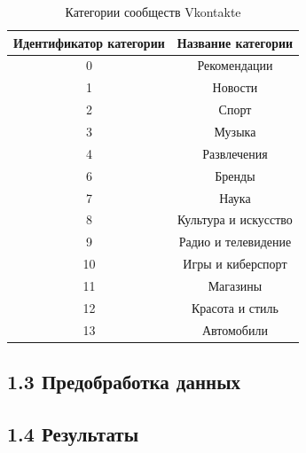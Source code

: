 \documentclass[a4paper]{report}
\begin{document}
	\begin{table}[]
\centering


\begin{tabular}{|c|c|}
\hline

\textbf{Идентификатор категории} & \textbf{Название категории} \\ \hline \hline
0                                & Рекомендации                \\ \hline
1                                & Новости                     \\ \hline
2                                & Спорт                       \\ \hline
3                                & Музыка                      \\ \hline
4                                & Развлечения                 \\ \hline
6                                & Бренды                      \\ \hline
7                                & Наука                       \\ \hline
8                                & Культура и искусство        \\ \hline
9                                & Радио и телевидение         \\ \hline
10                               & Игры и киберспорт           \\ \hline
11                               & Магазины                    \\ \hline
12                               & Красота и стиль             \\ \hline
13                               & Автомобили                  \\ \hline
\end{tabular}
\caption{Категории сообществ Vkontakte}
\label{table1} 
\end{table}
	
	
	
	
	
	
	
	
	
	
	
	
	
	
	
	
	\subsection{1.3 Предобработка данных}
	\subsection{1.4 Результаты} 
	
\end{document}
